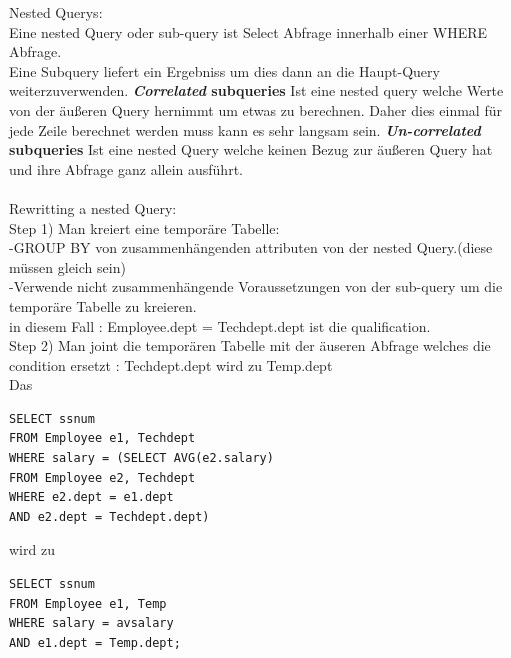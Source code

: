 \documentclass[12pt]{article}\pagestyle{myheadings}
\theoremstyle{plain}
\begin{document}
\begin{enumerate}
Nested Querys:\\
Eine nested Query oder sub-query ist Select Abfrage innerhalb einer WHERE Abfrage.\\
Eine Subquery liefert ein Ergebniss um dies dann an die Haupt-Query weiterzuverwenden.
\textbf{\textit{Correlated} subqueries}
Ist eine nested query welche Werte von der äußeren Query hernimmt um etwas zu berechnen.
Daher dies einmal für jede Zeile berechnet werden muss kann es sehr langsam sein.
\textbf{\textit{Un-correlated} subqueries} 
Ist eine nested Query welche keinen Bezug zur äußeren Query hat und ihre Abfrage ganz allein  ausführt.\\ \\
Rewritting a nested Query:\\
Step 1) Man kreiert eine temporäre Tabelle:\\-GROUP BY von zusammenhängenden attributen von der nested Query.(diese müssen gleich sein)\\
-Verwende nicht zusammenhängende Voraussetzungen von der sub-query um die temporäre Tabelle zu kreieren.\\
in diesem Fall : Employee.dept = Techdept.dept ist die qualification.\\
Step 2) Man joint die temporären Tabelle mit der äuseren Abfrage welches die condition ersetzt : Techdept.dept wird zu Temp.dept\\
Das \begin{verbatim}
SELECT ssnum
FROM Employee e1, Techdept
WHERE salary = (SELECT AVG(e2.salary)
FROM Employee e2, Techdept
WHERE e2.dept = e1.dept
AND e2.dept = Techdept.dept)
\end{verbatim}
wird zu
\begin{verbatim}
SELECT ssnum
FROM Employee e1, Temp
WHERE salary = avsalary
AND e1.dept = Temp.dept;
\end{verbatim}


\end{enumerate}
\end{document}
